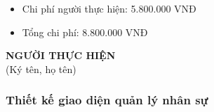 {\begin{minipage}{\textwidth}
\begin{itemize}
        \item Chi phí người thực hiện: 5.800.000 VNĐ
        \item Tổng chi phí: 8.800.000 VNĐ
    \end{itemize}
    \vspace{1cm}
    \begin{flushleft}
        \hspace{8cm} \textbf{NGƯỜI THỰC HIỆN} \\
        \hspace{8.8cm} (Ký tên, họ tên) \\
        \vspace{1cm}
    \end{flushleft}
    \end{minipage}
}
% 
\subsubsection{Thiết kế giao diện quản lý nhân sự}
